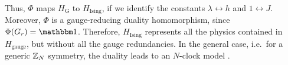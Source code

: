 Thus, $\Phi$ maps $H_{\text{G}}$ to $H_{\text{Ising}}$, if we identify the constants $\lambda \leftrightarrow h$ and $1 \leftrightarrow J$.
Moreover, $\Phi$ is a gauge-reducing duality homomorphism, since $\Phi(G_r) = \identity$.
Therefore, $H_{\text{Ising}}$ represents all the physics contained in $H_{\text{gauge}}$, but without all the gauge redundancies.
In the general case, i.e.~for a generic $\mathbb{Z}_N$ symmetry, the duality leads to an $N$-clock model \cite{radicevic2019spin}.






